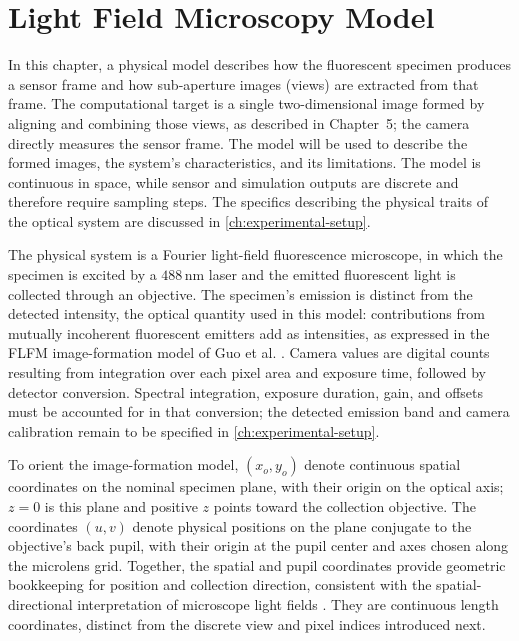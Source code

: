\chapter{Light Field Microscopy Model}

In this chapter, a physical model describes how the fluorescent specimen produces a sensor frame and how sub-aperture images (views) are extracted from that frame.
The computational target is a single two-dimensional image formed by aligning and combining those views, as described in Chapter~5; the camera directly measures the sensor frame.
The model will be used to describe the formed images, the system's characteristics, and its limitations.
The model is continuous in space, while sensor and simulation outputs are discrete and therefore require sampling steps.
The specifics describing the physical traits of the optical system are discussed in \cref{ch:experimental-setup}.

The physical system is a Fourier light-field fluorescence microscope, in which the specimen is excited by a $488\,\mathrm{nm}$ laser and the emitted fluorescent light is collected through an objective.
The specimen's emission is distinct from the detected intensity, the optical quantity used in this model: contributions from mutually incoherent fluorescent emitters add as intensities, as expressed in the FLFM image-formation model of Guo et al. \cite{guo2019fourierLightField}.
Camera values are digital counts resulting from integration over each pixel area and exposure time, followed by detector conversion.
Spectral integration, exposure duration, gain, and offsets must be accounted for in that conversion; the detected emission band and camera calibration remain to be specified in \cref{ch:experimental-setup}.

To orient the image-formation model, $(x_o,y_o)$ denote continuous spatial coordinates on the nominal specimen plane, with their origin on the optical axis; $z=0$ is this plane and positive $z$ points toward the collection objective.
The coordinates $(u,v)$ denote physical positions on the plane conjugate to the objective's back pupil, with their origin at the pupil center and axes chosen along the microlens grid.
Together, the spatial and pupil coordinates provide geometric bookkeeping for position and collection direction, consistent with the spatial-directional interpretation of microscope light fields \cite{levoy2009recordingControlling4d}.
They are continuous length coordinates, distinct from the discrete view and pixel indices introduced next.

